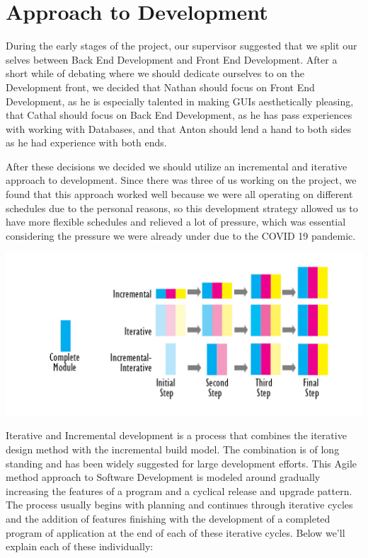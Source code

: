 \section{Approach to Development}
During the early stages of the project, our supervisor suggested that we split our selves between Back End Development and Front End Development. After a short while of debating where we should dedicate ourselves to on the Development front, we decided that Nathan should focus on Front End Development, as he is especially talented in making GUIs aesthetically pleasing, that Cathal should focus on Back End Development, as he has pass experiences with working with Databases, and that Anton should lend a hand to both sides as he had experience with both ends.\par
After these decisions we decided we should utilize an incremental and iterative approach to development. Since there was three of us working on the project, we found that this approach worked well because we were all operating on different schedules due to the personal reasons, so this development strategy allowed us to have more flexible schedules and relieved a lot of pressure, which was essential considering the pressure we were already under due to the COVID 19 pandemic. \par
\includegraphics[scale=1.3]{img/Incremental-Interative-Design-Approach.jpg} \par
\par Iterative and Incremental development is a process that combines the iterative design method with the incremental build model. The combination is of long standing  and has been widely suggested for large development efforts. This Agile method approach to Software Development is modeled around gradually increasing the features of a program and a cyclical release and upgrade pattern. The process usually begins with planning and continues through iterative cycles and the addition of features finishing with the development of a completed program of application at the end of each of these iterative cycles. Below we'll explain each of these individually:

